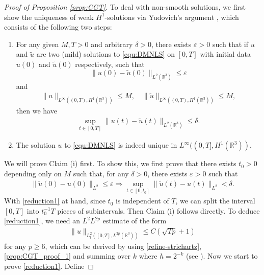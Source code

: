 \documentclass[10pt%
]{amsart}
\numberwithin{equation}{section}
\newcommand{\R}{\mathbb{R}}
\theoremstyle{definition}
\begin{document}
\begin{proof}[Proof of Proposition \ref{prop:CGT}]
	
	
	
	
	To deal with non-smooth solutions, we first show the uniqueness of weak $H^1$-solutions via Yudovich's argument \cite{BGT,Yudovich}, which consists of the following two steps: 
	\begin{enumerate}
		\item[(i)] For any given $M,T>0$ and arbitrary $\delta>0$, there exists $\varepsilon>0$ such that if $u$ and $\tilde{u}$ are two (mild) solutions to \eqref{equ:DMNLS} on $[0,T]$ with initial data $u(0)$ and $\tilde{u}(0)$ respectively, such that $$\|u(0)-\tilde{u}(0)\|_{L^2(\R^3)}\leq\varepsilon$$ and 
		\begin{align}
			\label{Yudovich_1}
			\|u\|_{L^\infty((0,T),H^1(\R^3))}\leq M,\quad 
			\|\tilde u\|_{L^\infty((0,T),H^1(\R^3))}\leq M,
		\end{align}
		then we have
		\begin{align*}
			\sup_{t\in[0,T]}\big\|u(t)-\tilde{u}(t)\big\|_{L^2(\R^3)}\leq\delta.
		\end{align*}    
		\item[(ii)] The solution $u$ to \eqref{equ:DMNLS} is indeed unique in $L^\infty ((0,T],H^1(\R^3))$. 
	\end{enumerate}
	We will prove Claim (i) first. To show this, we first prove that there exists $t_0>0$ depending only on $M$ such that, for any $\delta>0$, there exists $\varepsilon>0$ such that
	\begin{align}\label{reduction1}
		\|\tilde{u}(0)-u(0)\|_{L^2}\leq\varepsilon\Longrightarrow	\sup_{t\in[0,t_0]}\|\tilde{u}(t)-u(t)\|_{L^2}<\delta.
	\end{align}With \eqref{reduction1} at hand, since $t_0$ is independent of $T$, we can split the interval $[0,T]$ into $t_0^{-1}T$ pieces of subintervals. Then Claim (i) follows directly. To deduce \eqref{reduction1}, we need an $L^2L^{2p}$ estimate of the form 
	\begin{align}\label{refine-strichartz-2}
		\|u\|_{L_t^2([0,T],L^{2p}(\R^3))}\leq C(\sqrt{Tp}+1)
	\end{align}
	for any $p\ge6$, which can be derived by using \eqref{refine-strichartz}, \eqref{prop:CGT_proof_1} and summing over $k$ where  $h=2^{-k}$ (see \cite[Proof of Theorem 3]{BGT}). Now we start to prove \eqref{reduction1}. Define

\end{proof}
\end{document}
